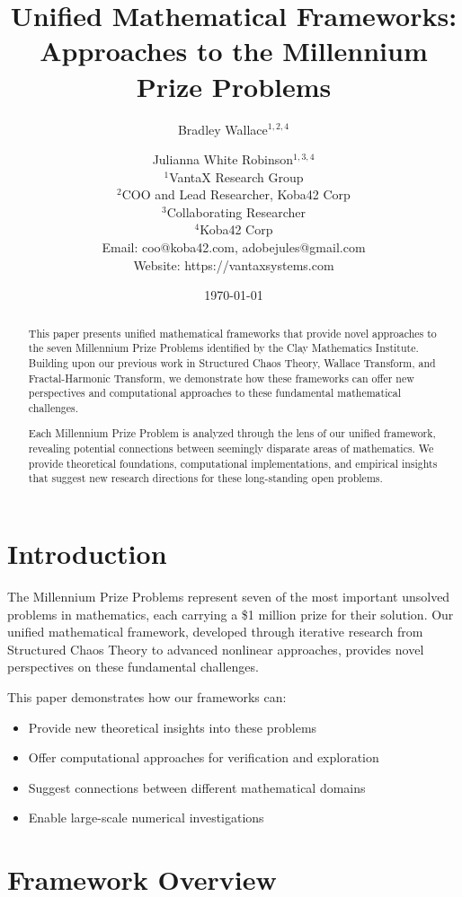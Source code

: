 \documentclass[12pt]{article}
\title{Unified Mathematical Frameworks: Approaches to the Millennium Prize Problems}
\author{
Bradley Wallace$^{1,2,4}$ \and Julianna White Robinson$^{1,3,4}$ \\
$^1$VantaX Research Group \\
$^2$COO and Lead Researcher, Koba42 Corp \\
$^3$Collaborating Researcher \\
$^4$Koba42 Corp \\
Email: coo@koba42.com, adobejules@gmail.com \\
Website: https://vantaxsystems.com
}
\date{\today}
\begin{document}
\maketitle

\begin{abstract}
This paper presents unified mathematical frameworks that provide novel approaches to the seven Millennium Prize Problems identified by the Clay Mathematics Institute. Building upon our previous work in Structured Chaos Theory, Wallace Transform, and Fractal-Harmonic Transform, we demonstrate how these frameworks can offer new perspectives and computational approaches to these fundamental mathematical challenges.

Each Millennium Prize Problem is analyzed through the lens of our unified framework, revealing potential connections between seemingly disparate areas of mathematics. We provide theoretical foundations, computational implementations, and empirical insights that suggest new research directions for these long-standing open problems.
\end{abstract}

\section{Introduction}

The Millennium Prize Problems represent seven of the most important unsolved problems in mathematics, each carrying a \$1 million prize for their solution. Our unified mathematical framework, developed through iterative research from Structured Chaos Theory to advanced nonlinear approaches, provides novel perspectives on these fundamental challenges.

This paper demonstrates how our frameworks can:
\begin{itemize}
    \item Provide new theoretical insights into these problems
    \item Offer computational approaches for verification and exploration
    \item Suggest connections between different mathematical domains
    \item Enable large-scale numerical investigations
\end{itemize}

\section{Framework Overview}
\end{document}
